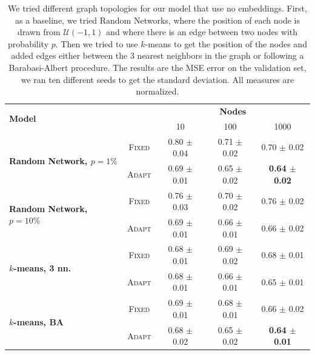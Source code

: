 \documentclass[a4paper,10pt]{article}
\begin{document}
\begin{table}
  \centering
  \begin{tabular}{lcccc} \toprule
    \multirow{2}{*}{\textbf{Model}}                      &                            & \multicolumn{3}{c}{\textbf{Nodes}}                                                           \\ \cmidrule(lr){3-5}
                                                         &                            & 10                                 & 100                    & 1000                           \\ \hline
    \multirow{2}{*}{\textbf{Random Network, $p=1\%$} }   & \scriptsize \textsc{Fixed} & 0.80  \tiny $\pm$ 0.04             & 0.71  \tiny $\pm$ 0.02 & 0.70 \tiny $\pm$ 0.02          \\
                                                         & \scriptsize \textsc{Adapt} & 0.69 \tiny $\pm$ 0.01              & 0.65 \tiny $\pm$ 0.02  & \textbf{0.64 \tiny $\pm$ 0.02} \\
    \multirow{2}{*}{\textbf{Random Network, $p=10\%$}}   & \scriptsize \textsc{Fixed} & 0.76  \tiny $\pm$ 0.03             & 0.70  \tiny $\pm$ 0.02 & 0.76 \tiny $\pm$ 0.02          \\
                                                         & \scriptsize \textsc{Adapt} & 0.69 \tiny $\pm$ 0.01              & 0.66 \tiny $\pm$ 0.01  & 0.66 \tiny $\pm$ 0.02          \\
    \multirow{2}{*}{\textbf{$k$-means, 3 nn.}          } & \scriptsize \textsc{Fixed} & 0.68  \tiny $\pm$ 0.01             & 0.69  \tiny $\pm$ 0.02 & 0.68 \tiny $\pm$ 0.01          \\
                                                         & \scriptsize \textsc{Adapt} & 0.68 \tiny $\pm$ 0.01              & 0.66 \tiny $\pm$ 0.01  & 0.65 \tiny $\pm$ 0.01          \\
    \multirow{2}{*}{\textbf{$k$-means, BA}             } & \scriptsize \textsc{Fixed} & 0.69  \tiny $\pm$ 0.01             & 0.68  \tiny $\pm$ 0.01 & 0.66 \tiny $\pm$ 0.02          \\
                                                         & \scriptsize \textsc{Adapt} & 0.68 \tiny $\pm$ 0.02              & 0.65 \tiny $\pm$ 0.02  & \textbf{0.64 \tiny $\pm$ 0.01} \\

    \bottomrule
  \end{tabular}
  \caption{
    We tried different graph topologies for our model that use no embeddings. First, as a baseline, we tried Random Networks, where the position of each node is drawn from $\mathcal{U}(-1,1)$ and where there is an edge between two nodes with probability $p$. Then we tried to use $k$-means to get the position of the nodes and added edges either between the 3 nearest neighbors in the graph or following a Barabasi-Albert procedure. The results are the MSE error on the validation set, we ran ten different seeds to get the standard deviation. All measures are normalized.
  }
  \label{tab:graphs}
\end{table}
\end{document}
